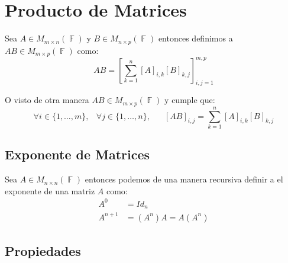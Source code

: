 \documentclass[12pt, fleqn]{report}                             %
\DeclareMathOperator \Space     {\quad}                         %
\DeclareMathOperator \MiniSpace {\;}                            %
\theoremstyle{break}                                            %
\DeclareMathOperator \GenericField {\mathbb{F}}                 %
\newcommand{\Brackets}[1]       {\left[ #1 \right]}             %
\begin{document}
        \clearpage
        \section{Producto de Matrices}

            Sea $A \in M_{m \times n}(\GenericField)$ y $B \in M_{n \times p}(\GenericField)$
            entonces definimos a $AB \in M_{m \times p}(\GenericField)$ como:
            \begin{equation*}
                AB = \Brackets{ \sum_{k = 1}^n [A]_{i, k} [B]_{k, j} }_{i, j = 1}^{m, p}
            \end{equation*}

            O visto de otra manera $AB \in M_{m \times p}(\GenericField)$ y cumple que:
            \begin{equation*}
                \forall i \in \{1, \dots, m\} ,\MiniSpace
                    \forall j \in \{1, \dots, n\} ,\Space
                        [AB]_{i, j} = \sum_{k = 1}^n [A]_{i, k} [B]_{k, j}
            \end{equation*}


            \vspace{1em}
            \subsection{Exponente de Matrices}

                Sea $A \in M_{n \times n}(\GenericField)$ entonces podemos de una manera recursiva definir a
                el exponente de una matriz $A$ como:
                \begin{align*}
                    A^0       &= Id_n                        \\
                    A^{n + 1} &= (A^n) A = A (A^n)      
                \end{align*}


            \clearpage
            \subsection{Propiedades}
\end{document}
